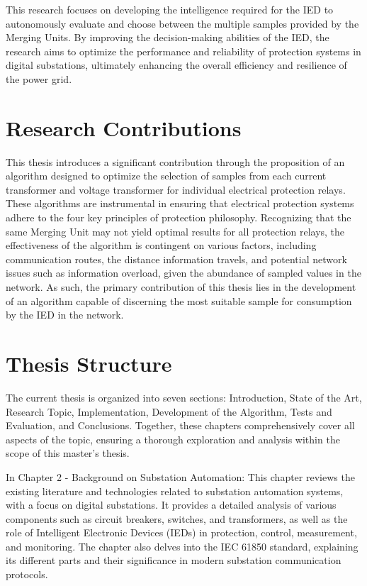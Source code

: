This research focuses on developing the intelligence required for the IED to autonomously evaluate and choose between the multiple samples provided by the Merging Units. By improving the decision-making abilities of the IED, the research aims to optimize the performance and reliability of protection systems in digital substations, ultimately enhancing the overall efficiency and resilience of the power grid.

\section{Research Contributions}
This thesis introduces a significant contribution through the proposition of an algorithm designed to optimize the selection of samples from each current transformer and voltage transformer for individual electrical protection relays. These algorithms are instrumental in ensuring that electrical protection systems adhere to the four key principles of protection philosophy. Recognizing that the same Merging Unit may not yield optimal results for all protection relays, the effectiveness of the algorithm is contingent on various factors, including communication routes, the distance information travels, and potential network issues such as information overload, given the abundance of sampled values in the network. As such, the primary contribution of this thesis lies in the development of an algorithm capable of discerning the most suitable sample for consumption by the IED in the network.

\section{Thesis Structure}

The current thesis is organized into seven sections: Introduction, State of the Art, Research Topic, Implementation, Development of the Algorithm, Tests and Evaluation, and Conclusions. Together, these chapters comprehensively cover all aspects of the topic, ensuring a thorough exploration and analysis within the scope of this master's thesis.

In Chapter 2 - Background on Substation Automation: This chapter reviews the existing literature and technologies related to substation automation systems, with a focus on digital substations. It provides a detailed analysis of various components such as circuit breakers, switches, and transformers, as well as the role of Intelligent Electronic Devices (IEDs) in protection, control, measurement, and monitoring. The chapter also delves into the IEC 61850 standard, explaining its different parts and their significance in modern substation communication protocols.

